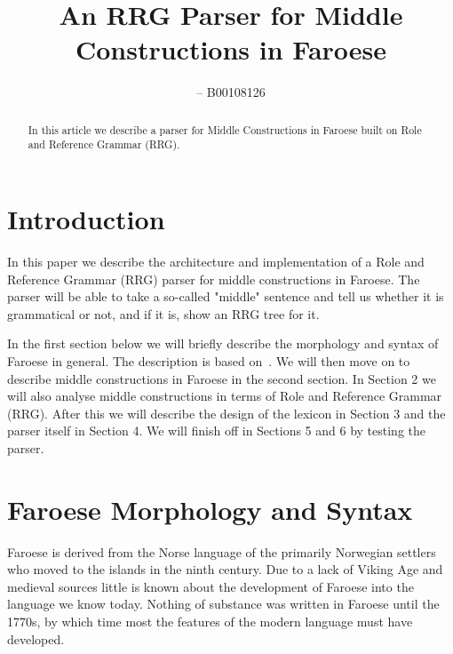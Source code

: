 \documentclass[12pt,%
]{lin-v2/lin}
\begin{document}
    
\leftrunning{}  %

\rightrunning{} %

\title{An RRG Parser for Middle Constructions in Faroese}

\author[1]{  -- B00108126}

\address[1]
{%
  , %
  , %
  , %
}

\maketitle

\begin{abstract}
    In this article we describe a parser for Middle Constructions
    in Faroese built on Role and Reference Grammar (RRG).
\end{abstract}


\section{Introduction}

In this paper we describe the architecture and implementation of a Role and Reference Grammar (RRG)
parser for middle constructions in Faroese. The parser will be able to take a so-called "middle"
sentence and tell us whether it is grammatical or not, and if it is, show an RRG tree for it.

In the first section below we will briefly describe the morphology
and syntax of Faroese in general. The description is based on~\citep{faroese}.
We will then move on to describe middle constructions in Faroese in the second section.
In Section 2 we will also analyse middle constructions in terms of
Role and Reference Grammar (RRG). After this we will 
describe the design of the lexicon in Section 3 and the parser itself in Section 4.
We will finish off in Sections 5 and 6 by testing the parser.


\section{Faroese Morphology and Syntax}

Faroese is derived from the Norse language of the primarily Norwegian settlers
who moved to the islands in the ninth century. Due to a lack of Viking Age
and medieval sources little is known about the development of Faroese into
the language we know today. Nothing of substance was written in Faroese
until the 1770s, by which time most the features of the modern language
must have developed.
\end{document}
